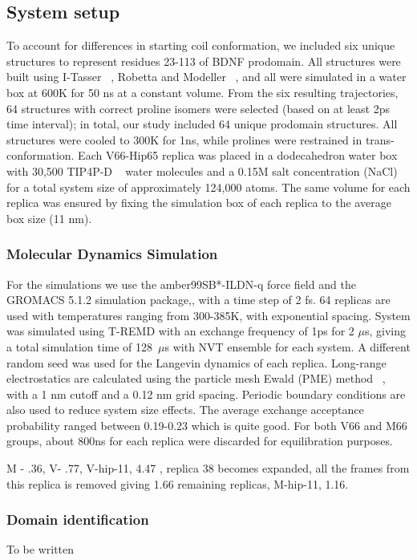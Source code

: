 \documentclass[journal=jacsat,manuscript=article]{achemso}
\begin{document}
\subsection*{System setup} To account for differences in starting coil conformation, we included six unique structures to represent residues 23-113 of BDNF prodomain.  All structures were built using I-Tasser ~\cite{Yang2014,Roy2010,Bioinformatics}, Robetta and Modeller ~\cite{Sali1993a}, and all were simulated in a water box at 600K for 50 ns at a constant volume. From the six resulting trajectories, 64 structures with correct proline isomers were selected (based on at least 2ps time interval); in total, our study included 64 unique prodomain structures. All structures were cooled to 300K for 1ns, while prolines were restrained in trans-conformation. Each V66-Hip65 replica was placed in a dodecahedron water box with 30,500 TIP4P-D ~\cite {Jorgensen1983} water molecules and a 0.15M salt concentration (NaCl) for a total system size of approximately 124,000 atoms. The same volume for each replica was ensured by fixing the simulation box of each replica to the average box size (11 nm).

\subsubsection*{Molecular Dynamics Simulation} For the simulations we use the amber99SB*-ILDN-q force field\cite{Lindorff-Larsen} and the GROMACS 5.1.2 simulation package,\cite{Berendsen1995,Abraham2015}, with a time step of 2 fs. 64 replicas are used with temperatures ranging from 300-385K, with exponential spacing. System was simulated using T-REMD \cite{Sugita1999a} with an exchange frequency of 1ps for 2 $\mu$s, giving a total simulation time of 128~$\mu$s with NVT ensemble for each system. A different random seed was used for the Langevin dynamics of each replica. Long-range electrostatics are calculated using the particle mesh Ewald (PME) method ~\cite{Essmann1995}, with a 1 nm cutoff and a 0.12 nm grid spacing. Periodic boundary conditions are also used to reduce system size effects. The average exchange acceptance probability ranged between 0.19-0.23 which is quite good. For both V66 and M66 groups, about 800ns for each replica were discarded for equilibration purposes. 

M - .36, V- .77, V-hip-11, 4.47 , replica 38 becomes expanded, all the frames from this replica is removed giving 1.66 remaining replicas, M-hip-11, 1.16. 

\subsubsection*{Domain identification} To be written
\end{document}
